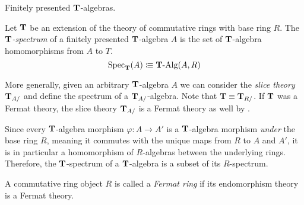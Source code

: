 {\begin{definition}
  Finitely presented \(\mathbf{T}\)-algebras.
\end{definition}

\begin{definition}
  Let \(\mathbf{T}\) be an extension of the theory of commutative rings with base ring \(R\).
  The \emph{\(\mathbf{T}\)-spectrum} of a finitely presented \(\mathbf{T}\)-algebra \(A\) is the set of \(\mathbf{T}\)-algebra homomorphisms from \(A\) to \(T\).
  \[\operatorname{Spec}_{\mathbf{T}}(A) \vcentcolon\mspace{-1.2mu}\equiv \mathbf{T}\text{-}\mathrm{Alg}(A,R)\]
\end{definition}

\begin{remark}
  More generally, given an arbitrary \(\mathbf{T}\)-algebra \(A\) we can consider the \emph{slice theory} \(\mathbf{T}_{A/}\) and define the spectrum of a \(\mathbf{T}_{A/}\)-algebra.
  Note that \(\mathbf{T} \equiv \mathbf{T}_{R/}\).
  If \(\mathbf{T}\) was a Fermat theory, the slice theory \(\mathbf{T}_{A/}\) is a Fermat theory as well by \cite[Proposition 1.5']{DK84}.
\end{remark}

Since every \(\mathbf{T}\)-algebra morphism \(\varphi : A \to A'\) is a \(\mathbf{T}\)-algebra morphism \emph{under} the base ring \(R\), meaning it commutes with the unique maps from \(R\) to \(A\) and \(A'\),  it is in particular a homomorphism of \(R\)-algebras between the underlying rings.
Therefore, the \(\mathbf{T}\)-spectrum of a \(\mathbf{T}\)-algebra is a subset of its \(R\)-spectrum.

\begin{definition}
  A commutative ring object \(R\) is called a \emph{Fermat ring} if its endomorphism theory is a Fermat theory.
\end{definition}

}
